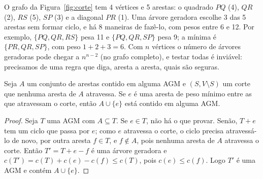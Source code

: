 \begin{exemplo}\label{ex:agmpequena}
O grafo da Figura~\ref{fig:corte} tem 4 vértices e 5 arestas: o quadrado $PQ$ (4), $QR$ (2), $RS$ (5), $SP$ (3) e a diagonal $PR$ (1). Uma árvore geradora escolhe 3 das 5 arestas sem formar ciclo, e há 8 maneiras de fazê-lo, com pesos entre 6 e 12. Por exemplo, $\{PQ,QR,RS\}$ pesa 11 e $\{PQ,QR,SP\}$ pesa 9; a mínima é $\{PR,QR,SP\}$, com peso $1+2+3=6$. Com $n$ vértices o número de árvores geradoras pode chegar a $n^{n-2}$ (no grafo completo), e testar todas é inviável: precisamos de uma regra que diga, aresta a aresta, quais são seguras.
\end{exemplo}

\begin{lema}\label{lema:corte}
Seja $A$ um conjunto de arestas contido em alguma AGM e $(S,V\setminus S)$ um corte que nenhuma aresta de $A$ atravessa. Se $e$ é uma aresta de peso mínimo entre as que atravessam o corte, então $A\cup\{e\}$ está contido em alguma AGM.
\end{lema}
\begin{proof}
Seja $T$ uma AGM com $A\subseteq T$. Se $e\in T$, não há o que provar. Senão, $T+e$ tem um ciclo que passa por $e$; como $e$ atravessa o corte, o ciclo precisa atravessá-lo de novo, por outra aresta $f\in T$, e $f\notin A$, pois nenhuma aresta de $A$ atravessa o corte. Então $T'=T+e-f$ é uma árvore geradora e $c(T')=c(T)+c(e)-c(f)\le c(T)$, pois $c(e)\le c(f)$. Logo $T'$ é uma AGM e contém $A\cup\{e\}$.
\end{proof}

